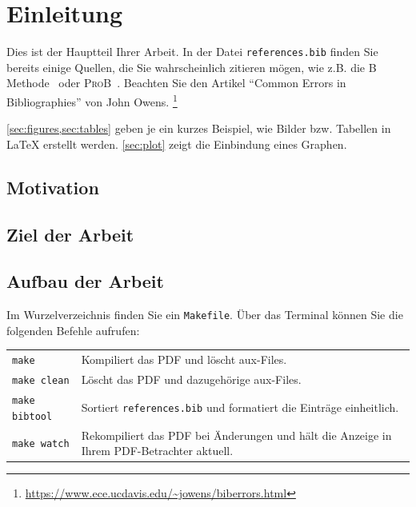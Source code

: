 %
%

\section{Einleitung}

Dies ist der Hauptteil Ihrer Arbeit.
In der Datei \texttt{references.bib} finden Sie bereits einige Quellen,
die Sie wahrscheinlich zitieren mögen,
wie z.B. die B Methode~\cite{abrial1996b,abrial2010modeling}
oder \textsc{ProB}~\cite{leuschel2003prob,leuschel2008prob}.
Beachten Sie den Artikel ``Common Errors in Bibliographies'' von John Owens.%
\footnote{\url{https://www.ece.ucdavis.edu/~jowens/biberrors.html}}

\cref{sec:figures,sec:tables}
geben je ein kurzes Beispiel,
wie Bilder bzw. Tabellen in \LaTeX{} erstellt werden.
\cref{sec:plot} zeigt die Einbindung eines Graphen.


\subsection{Motivation}

\subsection{Ziel der Arbeit}

\subsection{Aufbau der Arbeit}




Im Wurzelverzeichnis finden Sie ein \texttt{Makefile}.
Über das Terminal können Sie die folgenden Befehle aufrufen:


\begin{tabularx}{\textwidth}{lX}
  \toprule
  \texttt{make} & Kompiliert das PDF und löscht aux-Files. \\
  \texttt{make clean} & Löscht das PDF und dazugehörige aux-Files. \\
  \texttt{make bibtool} & Sortiert \texttt{references.bib}
  und formatiert die Einträge einheitlich. \\
  \texttt{make watch} & Rekompiliert das PDF bei Änderungen und
  hält die Anzeige in Ihrem PDF-Betrachter aktuell. \\
  \bottomrule
\end{tabularx}

